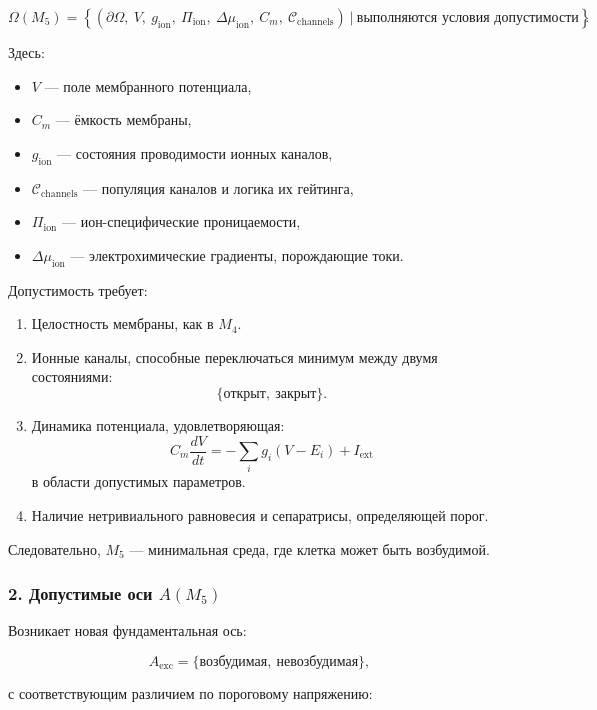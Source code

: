 \[
\Omega(M_5) =
\left\{
(\partial\Omega,\ V,\ g_{\mathrm{ion}},\
\Pi_{\mathrm{ion}},\
\Delta\mu_{\mathrm{ion}},\
C_m,\
\mathcal{C}_{\mathrm{channels}})
\ \Big|\
\text{выполняются условия допустимости}
\right\}.
\]

Здесь:

\begin{itemize}
    \item $V$ — поле мембранного потенциала,
    \item $C_m$ — ёмкость мембраны,
    \item $g_{\mathrm{ion}}$ — состояния проводимости ионных каналов,
    \item $\mathcal{C}_{\mathrm{channels}}$ — популяция каналов и логика их гейтинга,
    \item $\Pi_{\mathrm{ion}}$ — ион-специфические проницаемости,
    \item $\Delta\mu_{\mathrm{ion}}$ — электрохимические градиенты, порождающие токи.
\end{itemize}

Допустимость требует:

\begin{enumerate}
    \item Целостность мембраны, как в $M_4$.
    \item Ионные каналы, способные переключаться минимум между двумя состояниями:
          \[
          \{ \text{открыт},\ \text{закрыт} \}.
          \]
    \item Динамика потенциала, удовлетворяющая:
          \[
          C_m \frac{dV}{dt} = - \sum_i g_i (V - E_i) + I_{\mathrm{ext}}
          \]
          в области допустимых параметров.
    \item Наличие нетривиального равновесия и сепаратрисы, определяющей порог.
\end{enumerate}

Следовательно, $M_5$ — минимальная среда, где клетка может быть возбудимой.

\subsubsection*{2. Допустимые оси \texorpdfstring{$A(M_5)$}{A(M_5)}}

Возникает новая фундаментальная ось:

\[
A_{\mathrm{exc}} = \{ \text{возбудимая},\ \text{невозбудимая} \},
\]

с соответствующим различием по пороговому напряжению:

